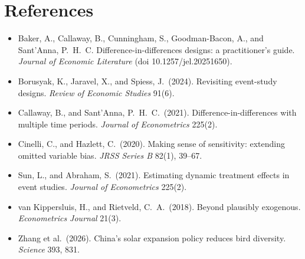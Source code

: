 \documentclass[11pt]{article}
\begin{document}
\section*{References}
\small
\begin{itemize}[leftmargin=12pt]
\item Baker, A., Callaway, B., Cunningham, S., Goodman-Bacon, A., and Sant'Anna, P.\ H.\ C. Difference-in-differences designs: a practitioner's guide. \textit{Journal of Economic Literature} (doi 10.1257/jel.20251650).
\item Borusyak, K., Jaravel, X., and Spiess, J.\ (2024). Revisiting event-study designs. \textit{Review of Economic Studies} 91(6).
\item Callaway, B., and Sant'Anna, P.\ H.\ C.\ (2021). Difference-in-differences with multiple time periods. \textit{Journal of Econometrics} 225(2).
\item Cinelli, C., and Hazlett, C.\ (2020). Making sense of sensitivity: extending omitted variable bias. \textit{JRSS Series B} 82(1), 39--67.
\item Sun, L., and Abraham, S.\ (2021). Estimating dynamic treatment effects in event studies. \textit{Journal of Econometrics} 225(2).
\item van Kippersluis, H., and Rietveld, C.\ A.\ (2018). Beyond plausibly exogenous. \textit{Econometrics Journal} 21(3).
\item Zhang et al.\ (2026). China's solar expansion policy reduces bird diversity. \textit{Science} 393, 831.
\end{itemize}
\end{document}
